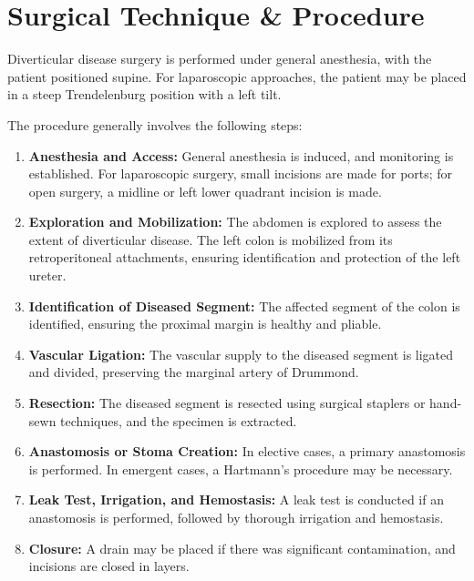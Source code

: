 \section*{Surgical Technique \& Procedure}
Diverticular disease surgery is performed under general anesthesia, with the patient positioned supine. For laparoscopic approaches, the patient may be placed in a steep Trendelenburg position with a left tilt.

The procedure generally involves the following steps:

\begin{enumerate}
  \item \textbf{Anesthesia and Access:} General anesthesia is induced, and monitoring is established. For laparoscopic surgery, small incisions are made for ports; for open surgery, a midline or left lower quadrant incision is made.
  
  \item \textbf{Exploration and Mobilization:} The abdomen is explored to assess the extent of diverticular disease. The left colon is mobilized from its retroperitoneal attachments, ensuring identification and protection of the left ureter.
  
  \item \textbf{Identification of Diseased Segment:} The affected segment of the colon is identified, ensuring the proximal margin is healthy and pliable.
  
  \item \textbf{Vascular Ligation:} The vascular supply to the diseased segment is ligated and divided, preserving the marginal artery of Drummond.
  
  \item \textbf{Resection:} The diseased segment is resected using surgical staplers or hand-sewn techniques, and the specimen is extracted.
  
  \item \textbf{Anastomosis or Stoma Creation:} In elective cases, a primary anastomosis is performed. In emergent cases, a Hartmann's procedure may be necessary.
  
  \item \textbf{Leak Test, Irrigation, and Hemostasis:} A leak test is conducted if an anastomosis is performed, followed by thorough irrigation and hemostasis.
  
  \item \textbf{Closure:} A drain may be placed if there was significant contamination, and incisions are closed in layers.
\end{enumerate}

